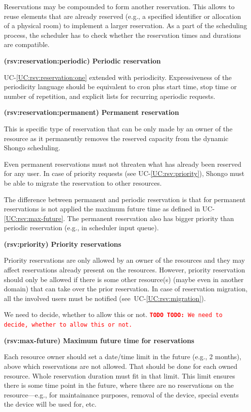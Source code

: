 \documentclass[a4paper]{report}
\makeatletter
\newcounter{UCcounter}
\newenvironment{UseCases}%
	{\begin{list}{\textbf{UC-\arabic{UCcounter}}}{\@nmbrlisttrue\def\@listctr{UCcounter}}}%
	{\end{list}}
\newcommand{\UClabel}[1]{\label{UC:#1}}
\newcommand{\UCref}[1]{UC-\ref{UC:#1}}
\newcommand{\UseCase}[2]{\item\UClabel{#2} \textbf{(#2) #1}\\ \nopagebreak}
\newcommand{\TODO}[1]{%
\def\empty{}%
\def\prvniparametr{#1}%
\ifx\prvniparametr\empty%
\begingroup\tt\textcolor{red}{\noindent\textbf{TODO}}\endgroup
\else%
\begingroup\tt\textcolor{red}{\noindent\textbf{TODO:}\ #1}\endgroup
\fi%
}
\makeatother
\begin{document}
\begin{UseCases}
Reservations may be compounded to form another reservation. This allows to
reuse elements that are already reserved (e.g., a specified identifier or
allocation of a physical room) to implement a larger reservation. As a part of
the scheduling process, the scheduler has to check whether the reservation
times and durations are compatible.


\UseCase{Periodic reservation}{rsv:reservation:periodic}

\UCref{rsv:reservation:one} extended with periodicity. Expressiveness of the
periodicity language should be equivalent to cron plus start time, stop time or number of repetition, and explicit lists for recurring aperiodic requests.

\UseCase{Permanent reservation}{rsv:reservation:permanent}

This is specific type of reservation that can be only made by an owner of the
resource as it permanently removes the reserved capacity from the dynamic
Shongo scheduling.

Even permanent reservations must not threaten what has already been reserved for any user. In case of priority requests (see \UCref{rsv:priority}), Shongo must be able to migrate the reservation to other resources.

The difference between permanent and periodic reservation is that for permanent reservations is not applied the maximum future time as defined in \UCref{rsv:max-future}. The permanent reservation also has bigger priority than periodic reservation (e.g., in scheduler input queue).

\UseCase{Priority reservations}{rsv:priority}

Priority reservations are only allowed by an owner of the resources and they
may affect reservations already present on the resources. However, priority
reservation should only be allowed if there is some other resource(s) (maybe
even in another domain) that can take over the prior reservation. In case of
reservation migration, all the involved users must be notified
(see~\UCref{rsv:migration}).

\TODO{We need to decide, whether to allow this or not.}


\UseCase{Maximum future time for reservations}{rsv:max-future}

Each resource owner should set a date/time limit in the future (e.g., 2
months), above which reservations are not allowed. That should be done for each owned resource. Whole reservation duration
must fit in that limit. This limit ensures there is some time point in the
future, where there are no reservations on the resource---e.g., for
maintainance purposes, removal of the device, special events the device will be
used for, etc.



\end{UseCases}
\end{document}
